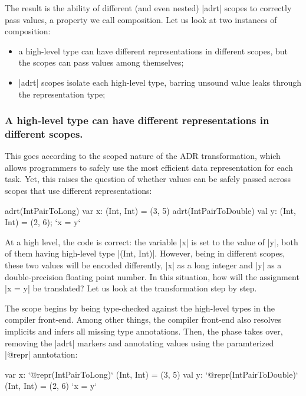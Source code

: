 The result is the ability of different (and even nested) |adrt| scopes to correctly pass values, a property we call composition. Let us look at two instances of composition:

\begin{itemize}
  \item a high-level type can have different representations in different scopes, but the scopes can pass values among themselves;
  \item |adrt| scopes isolate each high-level type, barring unsound value leaks through the representation type;
\end{itemize}

\subsubsection{A high-level type can have different representations in different scopes.} This goes according to the scoped nature of the ADR transformation, which allows programmers to safely use the most efficient data representation for each task. Yet, this raises the question of whether values can be safely passed across scopes that use different representations:

\begin{lstlisting-nobreak}
adrt(IntPairToLong)   { var x: (Int, Int) = (3, 5) }
adrt(IntPairToDouble) { val y: (Int, Int) = (2, 6); `x = y` }
\end{lstlisting-nobreak}

At a high level, the code is correct: the variable |x| is set to the value of |y|, both of them having high-level type |(Int, Int)|. However, being in different scopes, these two values will be encoded differently, |x| as a long integer and |y| as a double-precision floating point number. In this situation, how will the assignment |x = y| be translated? Let us look at the transformation step by step.

The scope begins by being type-checked against the high-level types in the compiler front-end. Among other things, the compiler front-end also resolves implicits and infers all missing type annotations. Then, the  \inject{} phase takes over, removing the |adrt| markers and annotating values using the paramterized |@repr| anntotation:

\begin{lstlisting-nobreak}
var x: `@repr(IntPairToLong)` (Int, Int) = (3, 5)
val y: `@repr(IntPairToDouble)` (Int, Int) = (2, 6)
`x = y`
\end{lstlisting-nobreak}

